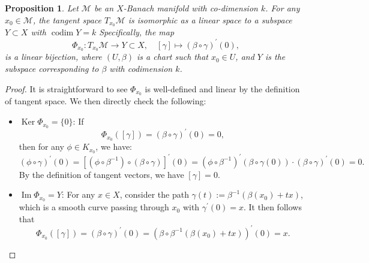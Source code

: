 \documentclass[12pt]{amsart}
\numberwithin{equation}{section}
\newtheorem{proposition}{Proposition}[section]
\theoremstyle{remark}
\begin{document}
\begin{proposition}
    \label{prop:tangent_space}
    Let $\mathcal M$ be an $X$-Banach manifold with co-dimension $k$.
    For any $x_0\in \mathcal M$, the tangent space $T_{x_0}\mathcal M$ is isomorphic as a linear space  to a subspace $Y\subset X$ with $ \operatorname{codim} Y= k$ Specifically, the map
    \begin{equation}
        \Phi_{x_0}: T_{x_0}\mathcal M \to Y\subset X, \quad [\gamma] \mapsto (\beta\circ \gamma)^\prime(0),
    \end{equation}
is a linear bijection, where $(U,\beta)$ is a chart such that $x_0\in U$,
and $Y$ is the subspace corresponding to $\beta$ with codimension $k$.
\end{proposition}
\begin{proof}
    It is straightforward to see  $\Phi_{x_0}$ is well-defined and linear by the definition of tangent space. We then directly check the following:
    \begin{itemize}
        \item $\operatorname{Ker} \Phi_{x_0}=\{0\}$:
        If
        \begin{equation}
            \Phi_{x_0}([\gamma])=(\beta\circ \gamma)^\prime(0)=0,
        \end{equation}
        then for any $\phi\in K_{x_0}$, we have:
        \begin{equation}
            (\phi\circ \gamma)^\prime(0) = [(\phi\circ \beta^{-1})\circ (\beta\circ \gamma)]^\prime(0) = (\phi\circ \beta^{-1})^\prime (\beta\circ\gamma(0))\cdot (\beta\circ \gamma)^\prime(0)=0.
        \end{equation}
        By the definition of tangent vectors, we have $[\gamma]=0$.
        \item $\operatorname{Im} \Phi_{x_0} = Y$: For any $x\in X$, consider the path $\gamma(t):= \beta^{-1}(\beta(x_0)+tx)$, which is a smooth curve passing through $x_0$ with $\gamma^\prime(0)=x$. It then follows that
        \begin{equation}
            \Phi_{x_0}([\gamma]) = (\beta\circ \gamma)^\prime(0) = (\beta\circ \beta^{-1}(\beta(x_0)+tx))^\prime(0) = x.
        \end{equation}
    \end{itemize}
\end{proof}
\end{document}
